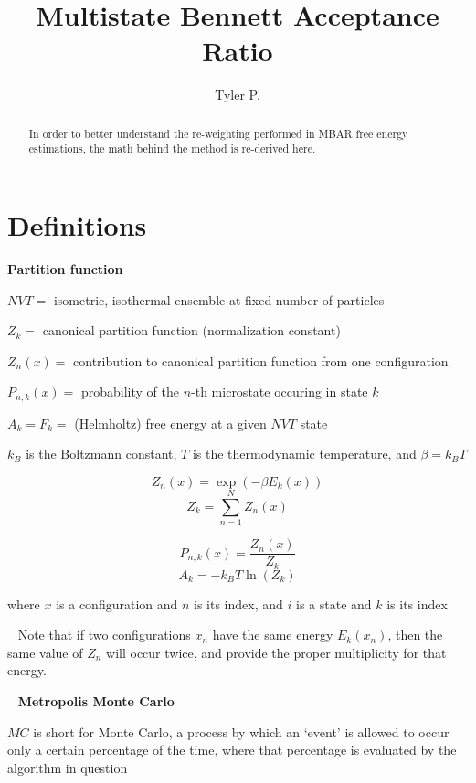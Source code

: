 \documentclass[]{article}
\title{Multistate Bennett Acceptance Ratio}
\author{Tyler P.}
\begin{document}
	
\maketitle

\begin{abstract}
	In order to better understand the re-weighting performed in MBAR free energy estimations, the math behind the method is re-derived here.
\end{abstract}

\section*{Definitions}
\textbf{Partition function}

$NVT =$ isometric, isothermal ensemble at fixed number of particles

$Z_k =$ canonical partition function (normalization constant)

$Z_n(x) =$ contribution to canonical partition function from one configuration

$P_{n,k}(x) =$ probability of the $n$-th microstate occuring in state $k$

$ A_k = F_k =$ (Helmholtz) free energy at a given $NVT$ state

$k_B$ is the Boltzmann constant, $T$ is the thermodynamic temperature, and $\beta = k_B T$

\begin{minipage}[b]{0.5\linewidth}
	\[ Z_n(x) = \exp(-\beta E_k(x)) \]
	\[ Z_k = \sum_{n=1}^{N} Z_n(x) \]
\end{minipage}
\begin{minipage}[b]{0.5\linewidth}
	\[ P_{n,k}(x) = \frac{Z_n(x)}{Z_k} \]
	\[ A_k = -k_B T \ln(Z_k) \]
\end{minipage}

where $x$ is a configuration and $n$ is its index,
and $i$ is a state and $k$ is its index

~\linebreak
Note that if two configurations $x_n$ have the same energy $E_k(x_n)$, then the same value of $Z_n$ will occur twice, and provide the proper multiplicity for that energy.

~\linebreak
\textbf{Metropolis Monte Carlo}\cite{bennett}

$MC$ is short for Monte Carlo, a process by which an `event' is allowed to occur only a certain percentage of the time, where that percentage is evaluated by the algorithm in question
\end{document}

